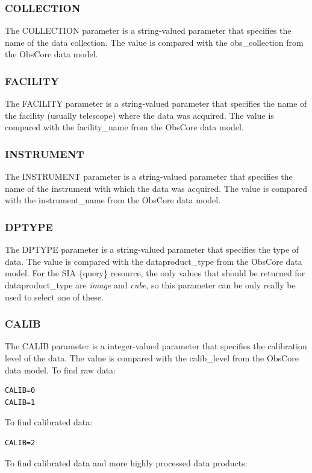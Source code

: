 \documentclass[11pt,a4paper]{ivoa}
\begin{document}
\subsubsection{COLLECTION}
The COLLECTION parameter is a string-valued parameter that specifies the name of the data collection. The value is compared with the obs\_collection from the ObsCore  data model.

\subsubsection{FACILITY}
The FACILITY parameter is a string-valued parameter that specifies the name of the facility (usually telescope) where the data was acquired. The value is compared with the facility\_name from the ObsCore data model.

\subsubsection{INSTRUMENT}
The INSTRUMENT parameter is a string-valued parameter that specifies the name of the instrument with which the data was acquired. The value is compared with the instrument\_name from the ObsCore data model.

\subsubsection{DPTYPE}
The DPTYPE parameter is a string-valued parameter that specifies the type of data. The value is compared with the dataproduct\_type from the ObsCore data model. For the SIA \{query\} resource, the only values that should be returned for dataproduct\_type are \textit{image} and \textit{cube}, so this parameter can be only really be used to select one of these.

\subsubsection{CALIB}
The CALIB parameter is a integer-valued parameter that specifies the calibration level of the data. The value is compared with the calib\_level from the ObsCore data model. To find raw data:

\begin{lstlisting}
CALIB=0
CALIB=1
\end{lstlisting}
To find calibrated data:

\begin{lstlisting}
CALIB=2
\end{lstlisting}
To find calibrated data and more highly processed data products:
\end{document}

